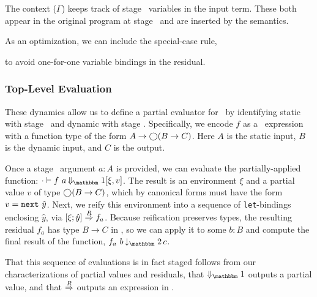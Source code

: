 The context ($\Gamma$) keeps track of stage \bbtwo\ variables in the input term. 
These both appear in the original program at stage \bbtwo\ and are inserted by the semantics.

As an optimization, we can include the special-case rule,
\begin{mathpar}
\end{mathpar}
to avoid one-for-one variable bindings in the residual.

\subsubsection {Top-Level Evaluation}
\label{sec:partialeval}


These dynamics allow us to define a partial evaluator for \lang\ by identifying
static with stage \bbone\ and dynamic with stage \bbtwo.  Specifically, we
encode $f$ as a \lang\ expression with a function type of the form
$A\to\fut(B\to C)$.%
%
Here $A$ is the static input, $B$ is the dynamic input, and $C$ is the output.

Once a stage \bbone\ argument $a:A$ is provided, we can evaluate the partially-applied
function:
$\cdot\vdash f~a \mathop{\redonesym} [\xi,v]$.
The result is an environment $\xi$ and a partial value $v$ of type $\fut(B\to
C)$, which by canonical forms must have the form $v = \next~\hat y$. 
Next, we reify this environment into a sequence of \verb|let|-bindings
enclosing $\hat y$, via $\reify\xi{\hat y}{f_a}$. 
Because reification preserves types, the resulting residual $f_a$ has type $B\to C$ in \langTwo, so we can apply it to some $b:B$
and compute the final result of the function, $f_a~b \mathop{\tworedsym} c$.

That this sequence of evaluations is in fact staged follows from our
characterizations of partial values and residuals, that $\redonesym$
outputs a partial value, and that $\reifysym$ outputs an expression in \langTwo.

